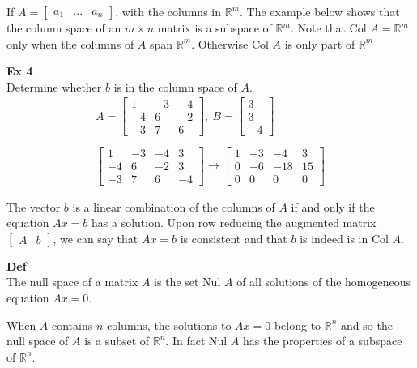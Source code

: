 \documentclass{article}
\begin{document}
  If $ A = \begin{bmatrix} a_1 &... &a_n \end{bmatrix} $, with the columns in $ \mathbb{R}^{m} $. The example below shows that the column space of an $ m \times n $ matrix is a subspace of $ \mathbb{R}^{m} $. Note that Col $ A = \mathbb{R}^{m} $ only when the columns of $ A $ span $ \mathbb{R}^{m} $. Otherwise Col $ A $  is only part of $ \mathbb{R}^{m} $

  \textbf{Ex 4}\\
  Determine whether $ b $ is in the column space of $ A $.
  \[
    \begin{gathered}
    A = \begin{bmatrix}
      1 &-3 &-4\\
      -4 &6 &-2\\
      -3 &7 &6
    \end{bmatrix},~ B=
    \begin{bmatrix}
      3\\
      3\\
      -4
    \end{bmatrix}\\
    ~\\
    \begin{bmatrix}
      1 &-3 &-4 &3\\
      -4 &6 &-2 &3\\
      -3 &7 &6 &-4
    \end{bmatrix} \to
    \begin{bmatrix}
      1 &-3 &-4 &3\\
      0 &-6 &-18 &15\\
      0 &0 &0 &0
    \end{bmatrix}
    \end{gathered}
  \]
  
  The vector $ b $ is a linear combination of the columns of $ A $ if and only if the equation $ Ax=b $ has a solution. Upon row reducing the augmented matrix $ \begin{bmatrix}
    A &b
  \end{bmatrix} $, we can say that $ Ax=b $ is consistent and that $ b $ is indeed is in Col $ A $.

  \textbf{Def}\\
  The null space of a matrix $ A $ is the set Nul $ A $ of all solutions of the homogeneous equation $ Ax=0 $. 

  When $ A $ contains $ n $ columns, the solutions to $ Ax=0 $ belong to $ \mathbb{R}^{n}  $ and so the null space of $ A $ is a subset of $ \mathbb{R}^{n} $. In fact Nul $ A $ has the properties of a subspace of $ \mathbb{R}^{n} $.
\end{document}
